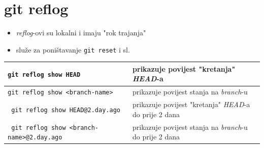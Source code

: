 \documentclass[10pt]{article}
\begin{document}
    \section*{\color{BrickRed} git reflog}
    \begin{itemize}
        \item \textit{reflog}-ovi su lokalni i imaju "rok trajanja"
        \item služe za poništavanje \texttt{git reset} i sl.
    \end{itemize}
    \begin{tabular}{|>{\tt}p{9.25cm}|>{}p{15.50cm}|}
        \hline
        git reflog show HEAD                        & prikazuje povijest "kretanja" \textit{HEAD}-a \\ \hline
        git reflog show <branch-name>               & prikazuje povijest stanja na \textit{branch}-u \\ \hline
        git reflog show HEAD@{2.day.ago}            & prikazuje povijest "kretanja" \textit{HEAD}-a do prije 2 dana \\ \hline
        git reflog show <branch-name>@{2.day.ago}   & prikazuje povijest stanja na \textit{branch}-u do prije 2 dana \\ \hline
    \end{tabular}
\end{document}
